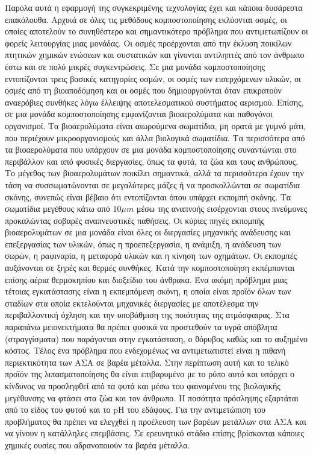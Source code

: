 \documentclass[12pt]{article}
\begin{document}
 	Παρόλα αυτά η εφαρμογή της συγκεκριμένης τεχνολογίας έχει και κάποια δυσάρεστα επακόλουθα. Αρχικά σε όλες τις μεθόδους κομποστοποίησης εκλύονται οσμές, οι οποίες αποτελούν το συνηθέστερο και σημαντικότερο πρόβλημα που αντιμετωπίζουν οι φορείς λειτουργίας μιας μονάδας. Οι οσμές προέρχονται από την έκλυση ποικίλων πτητικών χημικών ενώσεων και συστατικών και γίνονται αντιληπτές από τον άνθρωπο έστω και σε πολύ μικρές συγκεντρώσεις. Σε μια μονάδα κομποστοποίησης εντοπίζονται τρεις βασικές κατηγορίες οσμών, οι οσμές των εισερχόμενων υλικών, οι οσμές από τη βιοαποδόμηση και οι  οσμές που δημιουργούνται όταν επικρατούν αναερόβιες συνθήκες λόγω έλλειψης αποτελεσματικού συστήματος αερισμού. Επίσης, σε μια μονάδα κομποστοποίησης εμφανίζονται βιοαερολύματα και παθογόνοι οργανισμοί. Τα βιοαερολύματα είναι αιωρούμενα σωματίδια, μη ορατά με γυμνό μάτι, που περιέχουν μικροοργανισμούς και άλλα βιολογικά σωματίδια. Τα περισσότερα από τα βιοαερολύματα που υπάρχουν σε μια μονάδα κομποστοποίησης συναντώνται στο περιβάλλον και από φυσικές διεργασίες, όπως τα φυτά, τα ζώα και τους ανθρώπους. Το μέγεθος των βιοαερολυμάτων ποικίλει σημαντικά, αλλά τα περισσότερα έχουν την τάση να συσσωματώνονται σε μεγαλύτερες μάζες ή να προσκολλώνται σε σωματίδια σκόνης, συνεπώς είναι βέβαιο ότι εντοπίζονται όπου υπάρχει εκπομπή σκόνης. Τα σωματίδια μεγέθους κάτω από $10 \mu m$ μέσω της αναπνοής εισέρχονται στους πνεύμονες προκαλώντας σοβαρές αναπνευστικές παθήσεις. Οι κύριες πηγές εκπομπής βιοαερολυμάτων σε μια μονάδα είναι όλες οι διεργασίες μηχανικής ανάδευσης και επεξεργασίας των υλικών, όπως η προεπεξεργασία, η ανάμιξη, η ανάδευση των σωρών, η ραφιναρία, η μεταφορά υλικών και η κίνηση των οχημάτων. Οι εκπομπές αυξάνονται σε ξηρές και θερμές συνθήκες. Κατά την κομποστοποίηση εκπέμπονται επίσης αέρια θερμοκηπίου και διοξείδιο του άνθρακα. Ένα ακόμη πρόβλημα μιας τέτοιας εγκατάστασης είναι η εκπεμπόμενη σκόνη, η οποία είναι προϊόν όλων των σταδίων στα οποία εκτελούνται μηχανικές διεργασίες με αποτέλεσμα την περιβαλλοντική όχληση και την υποβάθμιση της ποιότητας της ατμόσφαιρας.  Στα παραπάνω μειονεκτήματα θα πρέπει φυσικά να προστεθούν τα υγρά απόβλητα (στραγγίσματα) που παράγονται στην εγκατάσταση, ο θόρυβος καθώς και το αυξημένο κόστος. Τέλος ένα πρόβλημα που ενδεχομένως να αντιμετωπιστεί είναι η πιθανή περιεκτικότητα των ΑΣΑ σε βαρέα μέταλλα. Στην περίπτωση αυτή και το τελικό προϊόν της λιπασματοποίησης θα είναι επιβαρυμένο με το ρύπο αυτό και υπάρχει ο κίνδυνος να προσληφθεί από τα φυτά και μέσω του φαινομένου της βιολογικής μεγέθυνσης να φτάσει στα ζώα και τον άνθρωπο. Η ποσότητα πρόσληψης εξαρτάται από το είδος του φυτού και το pH του εδάφους. Για την αντιμετώπιση του προβλήματος θα πρέπει να ελεγχθεί η προέλευση των βαρέων μετάλλων στα ΑΣΑ και να γίνουν η κατάλληλες επεμβάσεις. Σε ερευνητικό στάδιο επίσης βρίσκονται κάποιες χημικές ουσίες που αδρανοποιούν τα βαρέα μέταλλα.
 	
\end{document}
